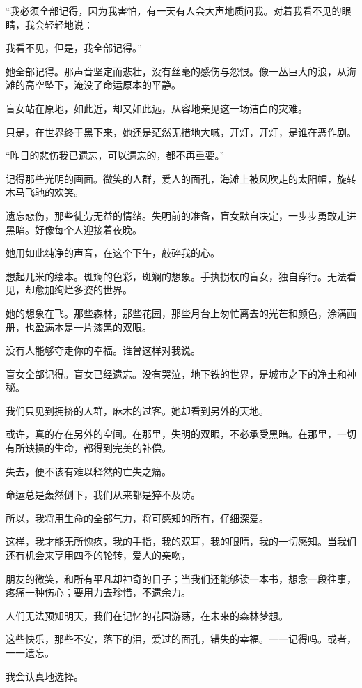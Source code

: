 \documentclass[12pt,a4paper]{article}
\begin{document}
		“我必须全部记得，因为我害怕，有一天有人会大声地质问我。对着我看不见的眼睛，我会轻轻地说：\par
		我看不见，但是，我全部记得。”

		她全部记得。那声音坚定而悲壮，没有丝毫的感伤与怨恨。像一丛巨大的浪，从海滩的高空坠下，淹没了命运原本的平静。\par
		盲女站在原地，如此近，却又如此远，从容地亲见这一场洁白的灾难。\par
		只是，在世界终于黑下来，她还是茫然无措地大喊，开灯，开灯，是谁在恶作剧。

		“昨日的悲伤我已遗忘，可以遗忘的，都不再重要。”

		记得那些光明的画面。微笑的人群，爱人的面孔，海滩上被风吹走的太阳帽，旋转木马飞驰的欢笑。\par
		遗忘悲伤，那些徒劳无益的情绪。失明前的准备，盲女默自决定，一步步勇敢走进黑暗。好像每个人迎接着夜晚。\par
		她用如此纯净的声音，在这个下午，敲碎我的心。

		想起几米的绘本。斑斓的色彩，斑斓的想象。手执拐杖的盲女，独自穿行。无法看见，却愈加绚烂多姿的世界。\par
		她的想象在飞。那些森林，那些花园，那些月台上匆忙离去的光芒和颜色，涂满画册，也盈满本是一片漆黑的双眼。\par
		没有人能够夺走你的幸福。谁曾这样对我说。\par
		盲女全部记得。盲女已经遗忘。没有哭泣，地下铁的世界，是城市之下的净土和神秘。\par
		我们只见到拥挤的人群，麻木的过客。她却看到另外的天地。\par
		或许，真的存在另外的空间。在那里，失明的双眼，不必承受黑暗。在那里，一切有所缺损的生命，都得到完美的补偿。\par
		失去，便不该有难以释然的亡失之痛。\par
		命运总是轰然倒下，我们从来都是猝不及防。

		所以，我将用生命的全部气力，将可感知的所有，仔细深爱。

		这样，我才能无所愧疚，我的手指，我的双耳，我的眼睛，我的一切感知。当我们还有机会来享用四季的轮转，爱人的亲吻，\par
		朋友的微笑，和所有平凡却神奇的日子；当我们还能够读一本书，想念一段往事，疼痛一种伤心；要用力去珍惜，不遗余力。\par
		人们无法预知明天，我们在记忆的花园游荡，在未来的森林梦想。\par
		这些快乐，那些不安，落下的泪，爱过的面孔，错失的幸福。一一记得吗。或者，一一遗忘。\par
		我会认真地选择。
\end{document}
